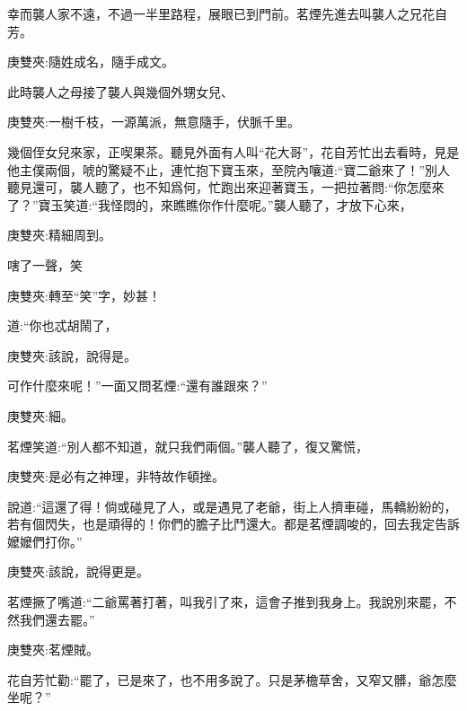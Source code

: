 \begin{parag}
    幸而襲人家不遠，不過一半里路程，展眼已到門前。茗煙先進去叫襲人之兄花自芳。\begin{note}庚雙夾:隨姓成名，隨手成文。\end{note}此時襲人之母接了襲人與幾個外甥女兒、\begin{note}庚雙夾:一樹千枝，一源萬派，無意隨手，伏脈千里。\end{note}幾個侄女兒來家，正喫果茶。聽見外面有人叫“花大哥”，花自芳忙出去看時，見是他主僕兩個，唬的驚疑不止，連忙抱下寶玉來，至院內嚷道:“寶二爺來了！”別人聽見還可，襲人聽了，也不知爲何，忙跑出來迎著寶玉，一把拉著問:“你怎麼來了？”寶玉笑道:“我怪悶的，來瞧瞧你作什麼呢。”襲人聽了，才放下心來，\begin{note}庚雙夾:精細周到。\end{note}嗐了一聲，笑\begin{note}庚雙夾:轉至“笑”字，妙甚！\end{note}道:“你也忒胡鬧了，\begin{note}庚雙夾:該說，說得是。\end{note}可作什麼來呢！”一面又問茗煙:“還有誰跟來？”\begin{note}庚雙夾:細。\end{note}茗煙笑道:“別人都不知道，就只我們兩個。”襲人聽了，復又驚慌，\begin{note}庚雙夾:是必有之神理，非特故作頓挫。\end{note}說道:“這還了得！倘或碰見了人，或是遇見了老爺，街上人擠車碰，馬轎紛紛的，若有個閃失，也是頑得的！你們的膽子比鬥還大。都是茗煙調唆的，回去我定告訴嬤嬤們打你。”\begin{note}庚雙夾:該說，說得更是。\end{note}茗煙撅了嘴道:“二爺罵著打著，叫我引了來，這會子推到我身上。我說別來罷，不然我們還去罷。”\begin{note}庚雙夾:茗煙賊。\end{note}花自芳忙勸:“罷了，已是來了，也不用多說了。只是茅檐草舍，又窄又髒，爺怎麼坐呢？”
\end{parag}


